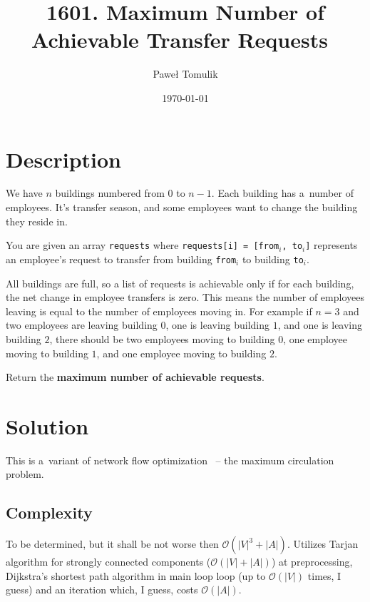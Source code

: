 \documentclass[paper=a4,parskip=half,DIV=12]{leetcode}
\begin{document}
\title{1601. Maximum Number of Achievable Transfer Requests~\cite{leetcode:1601}}
\subtitle{}
\author{Paweł Tomulik}
\date{\today}
\maketitle

\section{Description}
\label{sec:description}

We have $n$ buildings numbered from $0$ to $n - 1$. Each building has a~number
of employees. It's transfer season, and some employees want to change the
building they reside in.

You are given an array \texttt{requests} where \texttt{requests[i] = [from$_i$,
to$_i$]} represents an employee's request to transfer from building
\texttt{from$_i$} to building \texttt{to$_i$}.

All buildings are full, so a list of requests is achievable only if for each
building, the net change in employee transfers is zero. This means the number
of employees leaving is equal to the number of employees moving in. For example
if $n = 3$ and two employees are leaving building $0$, one is leaving building
$1$, and one is leaving building $2$, there should be two employees moving to
building $0$, one employee moving to building $1$, and one employee moving to
building $2$.

Return the \textbf{maximum number of achievable requests}.

\section{Solution}
\label{sec:solution}

This is a~variant of network flow optimization~\cite{ahuja1993network} --
the maximum circulation problem.

\subsection{Complexity}
\label{sec:complexity}

To be determined, but it shall be not worse then $\mathcal{O}(|V|^3 + |A|)$.
Utilizes Tarjan algorithm for strongly connected components ($\mathcal{O}(|V| + |A|)$)
at preprocessing, Dijkstra's shortest path algorithm in main loop loop
(up to $\mathcal{O}(|V|)$ times, I guess) and an iteration which, I guess,
costs $\mathcal{O}(|A|)$.
\end{document}
